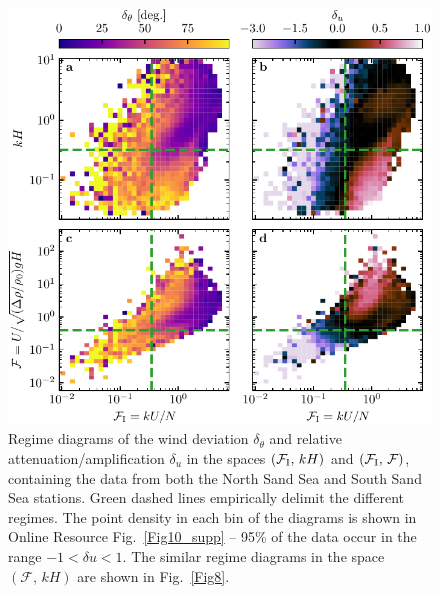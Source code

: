 \begin{figure}[p]
\centering
\includegraphics[scale=1]{Figures/Figure11_supp.pdf}
\caption{Regime diagrams of the wind deviation $\delta_{\theta}$ and relative attenuation/amplification $\delta_{u}$ in the spaces $(\mathcal{F}_{\textup{I}}, \, kH)$ and $(\mathcal{F}_{\textup{I}}, \, \mathcal{F})$, containing the data from both the North Sand Sea and South Sand Sea stations. Green dashed lines empirically delimit the different regimes. The point density in each bin of the diagrams is shown in Online Resource Fig.~\ref{Fig10_supp} -- 95\% of the data occur in the range $-1 < \delta u < 1$. The similar regime diagrams in the space $(\mathcal{F}, \, kH)$ are shown in Fig.~\ref{Fig8}.}
\label{Fig11_supp}
\end{figure}

